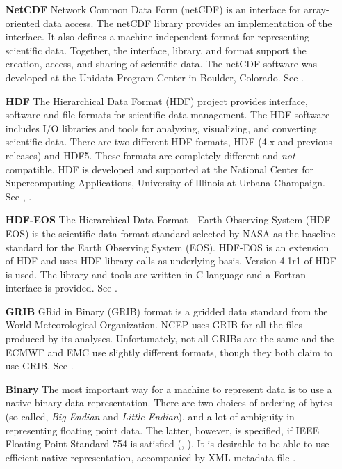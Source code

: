 \begin{itemize}
\item[\bf NetCDF] Network Common Data Form (netCDF) is an interface for 
array-oriented data access. The netCDF library provides an
implementation of the interface. It also defines a 
machine-independent format for representing scientific data. Together,
the interface, library, and format support the creation, access, and
sharing of scientific data. The netCDF software was developed at the
Unidata Program Center in Boulder, Colorado. See \cite{NetCDF3_UsersGuide_C}.

\item[\bf HDF] The Hierarchical Data Format (HDF) project provides
interface,  software and file formats for scientific data management. 
The HDF software includes I/O libraries and tools for analyzing,
visualizing, and converting scientific data. There are two different
HDF formats, HDF (4.x and previous releases) and HDF5. These formats
are completely different and {\it not} compatible. HDF is developed
and supported at the National Center for Supercomputing Applications,
University of Illinois at Urbana-Champaign. See
\cite{HDF4_tutorials}, \cite{HDF5_tutorial}.

\item[\bf HDF-EOS]  The Hierarchical Data Format - Earth Observing
System (HDF-EOS) is the scientific data format standard selected by
NASA as the baseline standard for the Earth Observing System (EOS). HDF-EOS
is an extension of HDF and uses HDF library calls as underlying
basis. Version 4.1r1 of HDF is used. The library and tools are written
in C language and a Fortran interface is provided. See \cite{HDF-EOS}.

\item[\bf GRIB] GRid in Binary (GRIB) format is a gridded data
standard from the World Meteorological Organization. NCEP uses GRIB
for all the files produced by its analyses. Unfortunately, not all
GRIBs are the same and the ECMWF and EMC use slightly different
formats, though they both claim to use GRIB. See \cite{GRIB_1}.


\item[\bf Binary]
The most important way for a machine to represent data is to use a
native binary data representation. There are  two choices of ordering of 
bytes (so-called, {\it Big Endian} and {\it Little Endian}), and a lot of
ambiguity in representing floating point data. The latter, however, is
specified, if IEEE Floating Point Standard 754 is satisfied 
(\cite{IEEE-Floating-Point}, \cite{Kahan-IEEE-754}). It is
desirable to be able to use efficient native representation,
accompanied by XML metadata file \cite{XML-W3C}. 
\end{itemize}

